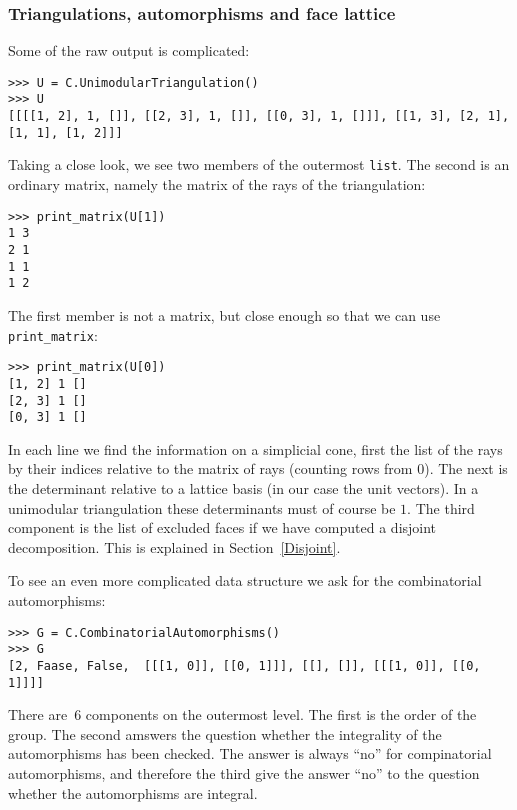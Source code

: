 \begin{small}
\subsubsection{Triangulations, automorphisms and face lattice}
Some of the raw output is complicated:
\begin{Verbatim}
>>> U = C.UnimodularTriangulation()
>>> U
[[[[1, 2], 1, []], [[2, 3], 1, []], [[0, 3], 1, []]], [[1, 3], [2, 1], [1, 1], [1, 2]]]
\end{Verbatim}
Taking a close look, we see two members of the outermost \verb|list|. The second is an ordinary matrix, namely the matrix of the rays of the triangulation:
\begin{Verbatim}
>>> print_matrix(U[1])
1 3
2 1
1 1
1 2
\end{Verbatim}
The first member is not a matrix, but close enough so that we can use \verb|print_matrix|:
\begin{Verbatim}
>>> print_matrix(U[0])
[1, 2] 1 []
[2, 3] 1 []
[0, 3] 1 []
\end{Verbatim}
In each line we find the information on a simplicial cone, first the list of the rays by their indices relative to the matrix of rays (counting rows from $0$). The next is the determinant relative to a lattice basis (in our case the unit vectors). In a unimodular triangulation these determinants must of course be $1$. The third component is the list of excluded faces if we have computed a disjoint decomposition. This is explained in Section~\ref{Disjoint}.

To see an even more complicated data structure we ask for the combinatorial automorphisms:
\begin{Verbatim}
>>> G = C.CombinatorialAutomorphisms()
>>> G
[2, Faase, False,  [[[1, 0]], [[0, 1]]], [[], []], [[[1, 0]], [[0, 1]]]]
\end{Verbatim}
There are~$6$ components on the outermost level. The first is the order of the group. The second amswers the question whether the integrality of the automorphisms has been checked. The answer is always ``no'' for compinatorial automorphisms, and therefore the third give the answer ``no'' to the question whether the automorphisms are integral.


\end{small}
